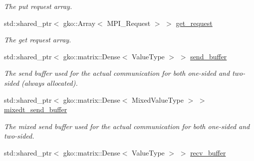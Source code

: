 \begin{DoxyCompactItemize}
\begin{DoxyCompactList}\small\item\em The put request array. \end{DoxyCompactList}\item 
\mbox{\label{structschwz_1_1Communicate_1_1comm__struct_a91cc6e7d906fbb693e4dff2dee609c94}} 
std\+::shared\+\_\+ptr$<$ gko\+::\+Array$<$ M\+P\+I\+\_\+\+Request $>$ $>$ \hyperlink{structschwz_1_1Communicate_1_1comm__struct_a91cc6e7d906fbb693e4dff2dee609c94}{get\+\_\+request}
\begin{DoxyCompactList}\small\item\em The get request array. \end{DoxyCompactList}\item 
\mbox{\label{structschwz_1_1Communicate_1_1comm__struct_afc441e718856c45bd3cc462780886ca8}} 
std\+::shared\+\_\+ptr$<$ gko\+::matrix\+::\+Dense$<$ Value\+Type $>$ $>$ \hyperlink{structschwz_1_1Communicate_1_1comm__struct_afc441e718856c45bd3cc462780886ca8}{send\+\_\+buffer}
\begin{DoxyCompactList}\small\item\em The send buffer used for the actual communication for both one-\/sided and two-\/sided (always allocated). \end{DoxyCompactList}\item 
\mbox{\label{structschwz_1_1Communicate_1_1comm__struct_a357d96eeeb734a275f78782e7e6542a8}} 
std\+::shared\+\_\+ptr$<$ gko\+::matrix\+::\+Dense$<$ Mixed\+Value\+Type $>$ $>$ \hyperlink{structschwz_1_1Communicate_1_1comm__struct_a357d96eeeb734a275f78782e7e6542a8}{mixedt\+\_\+send\+\_\+buffer}
\begin{DoxyCompactList}\small\item\em The mixed send buffer used for the actual communication for both one-\/sided and two-\/sided. \end{DoxyCompactList}\item 
\mbox{\label{structschwz_1_1Communicate_1_1comm__struct_a7b02126d598b9054b9adf0ebc9b3138c}} 
std\+::shared\+\_\+ptr$<$ gko\+::matrix\+::\+Dense$<$ Value\+Type $>$ $>$ \hyperlink{structschwz_1_1Communicate_1_1comm__struct_a7b02126d598b9054b9adf0ebc9b3138c}{recv\+\_\+buffer}

\end{DoxyCompactItemize}
